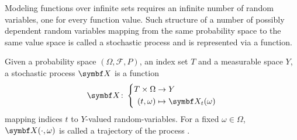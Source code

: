Modeling functions over infinite sets requires an infinite number of random variables, one for every function value.
Such structure of a number of possibly dependent random variables mapping from the same probability space to the same value space is called a stochastic process and is represented via a function.
\begin{definition}
    \label{def:gp:stochastic_process}
    Given a probability space $(\Omega, \mathcal{F}, P)$, an index set $T$ and a measurable space $Y$, a stochastic process $\rv{X}$ is a function
    \begin{align}
        \rv{X} \colon \left\{\begin{aligned}
            T \times \Omega & \to Y                    \\
            (t, \omega)     & \mapsto \rv{X}_t(\omega)
        \end{aligned}\right.
    \end{align}
    mapping indices $t$ to $Y$-valued random-variables.
    For a fixed $\omega \in \Omega$, $\rv{X}(\cdot, \omega)$ is called a trajectory of the process \cite{astrom_introduction_1971}.
\end{definition}

